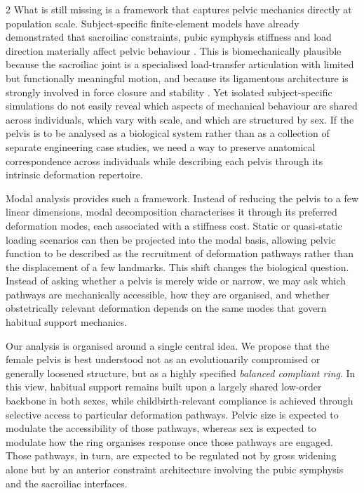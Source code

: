 \documentclass[openacc]{rsproca_new}
\begin{document}
\begin{multicols}{2}
What is still missing is a framework that captures pelvic mechanics directly at population scale. Subject-specific finite-element models have already demonstrated that sacroiliac constraints, pubic symphysis stiffness and load direction materially affect pelvic behaviour \cite{Eichenseer2011,Hammer2013}. This is biomechanically plausible because the sacroiliac joint is a specialised load-transfer articulation with limited but functionally meaningful motion, and because its ligamentous architecture is strongly involved in force closure and stability \cite{Vleeming2012,Kiapour2019,ChoKwak2020}. Yet isolated subject-specific simulations do not easily reveal which aspects of mechanical behaviour are shared across individuals, which vary with scale, and which are structured by sex. If the pelvis is to be analysed as a biological system rather than as a collection of separate engineering case studies, we need a way to preserve anatomical correspondence across individuals while describing each pelvis through its intrinsic deformation repertoire.

Modal analysis provides such a framework. Instead of reducing the pelvis to a few linear dimensions, modal decomposition characterises it through its preferred deformation modes, each associated with a stiffness cost. Static or quasi-static loading scenarios can then be projected into the modal basis, allowing pelvic function to be described as the recruitment of deformation pathways rather than the displacement of a few landmarks. This shift changes the biological question. Instead of asking whether a pelvis is merely wide or narrow, we may ask which pathways are mechanically accessible, how they are organised, and whether obstetrically relevant deformation depends on the same modes that govern habitual support mechanics.

Our analysis is organised around a single central idea. We propose that the female pelvis is best understood not as an evolutionarily compromised or generally loosened structure, but as a highly specified \emph{balanced compliant ring}. In this view, habitual support remains built upon a largely shared low-order backbone in both sexes, while childbirth-relevant compliance is achieved through selective access to particular deformation pathways. Pelvic size is expected to modulate the accessibility of those pathways, whereas sex is expected to modulate how the ring organises response once those pathways are engaged. Those pathways, in turn, are expected to be regulated not by gross widening alone but by an anterior constraint architecture involving the pubic symphysis and the sacroiliac interfaces.


\end{multicols}
\end{document}
